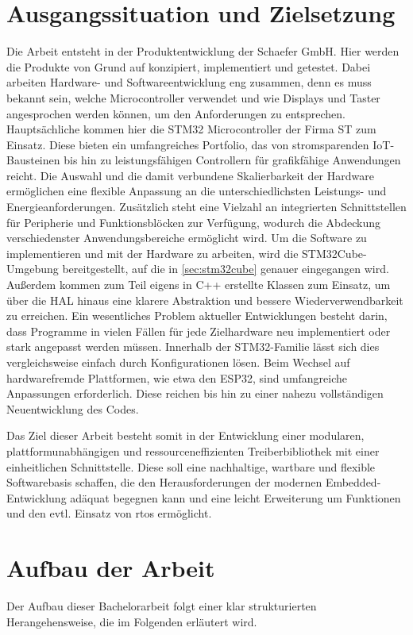 \section{Ausgangssituation und Zielsetzung}
Die Arbeit entsteht in der Produktentwicklung der Schaefer GmbH.
Hier werden die Produkte von Grund auf konzipiert, implementiert und getestet.
Dabei arbeiten Hardware- und Softwareentwicklung eng zusammen, denn es muss bekannt sein, welche Microcontroller verwendet und wie Displays und Taster angesprochen werden können, um den Anforderungen zu entsprechen.
Hauptsächliche kommen hier die STM32 Microcontroller der Firma ST zum Einsatz.
Diese bieten ein umfangreiches Portfolio, das von stromsparenden IoT-Bausteinen bis hin zu leistungsfähigen Controllern für grafikfähige Anwendungen reicht.
Die Auswahl und die damit verbundene Skalierbarkeit der Hardware ermöglichen eine flexible Anpassung an die unterschiedlichsten Leistungs- und Energieanforderungen.
Zusätzlich steht eine Vielzahl an integrierten Schnittstellen für Peripherie und Funktionsblöcken zur Verfügung, wodurch die Abdeckung verschiedenster Anwendungsbereiche ermöglicht wird.
Um die Software zu implementieren und mit der Hardware zu arbeiten, wird die STM32Cube-Umgebung bereitgestellt, auf die in \cref{sec:stm32cube} genauer eingegangen wird.
Außerdem kommen zum Teil eigens in C++ erstellte Klassen zum Einsatz, um über die HAL hinaus eine klarere Abstraktion und bessere Wiederverwendbarkeit zu erreichen.
Ein wesentliches Problem aktueller Entwicklungen besteht darin, dass Programme in vielen Fällen für jede Zielhardware neu implementiert oder stark angepasst werden müssen.
Innerhalb der STM32-Familie lässt sich dies vergleichsweise einfach durch Konfigurationen lösen. 
Beim Wechsel auf hardwarefremde Plattformen, wie etwa den ESP32, sind umfangreiche Anpassungen erforderlich. 
Diese reichen bis hin zu einer nahezu vollständigen Neuentwicklung des Codes.

Das Ziel dieser Arbeit besteht somit in der Entwicklung einer modularen, plattformunabhängigen und ressourceneffizienten Treiberbibliothek mit einer einheitlichen Schnittstelle. 
Diese soll eine nachhaltige, wartbare und flexible Softwarebasis schaffen, die den Herausforderungen der modernen Embedded-Entwicklung adäquat begegnen kann und eine  leicht Erweiterung um Funktionen und den evtl. Einsatz von \gls{rtos} ermöglicht.


\section{Aufbau der Arbeit}
Der Aufbau dieser Bachelorarbeit folgt einer klar strukturierten Herangehensweise, die im Folgenden erläutert wird. 

